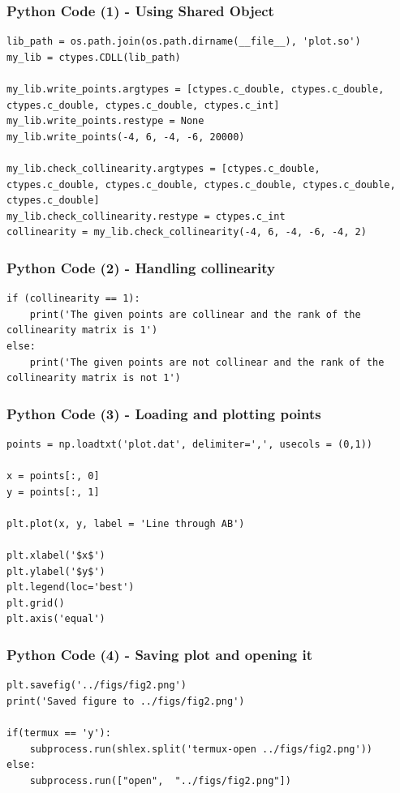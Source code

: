 \documentclass{beamer}
\begin{document}
\begin{frame}[fragile]
    \frametitle{Python Code (1) - Using Shared Object}
    \begin{lstlisting}
lib_path = os.path.join(os.path.dirname(__file__), 'plot.so')
my_lib = ctypes.CDLL(lib_path)

my_lib.write_points.argtypes = [ctypes.c_double, ctypes.c_double, ctypes.c_double, ctypes.c_double, ctypes.c_int]
my_lib.write_points.restype = None
my_lib.write_points(-4, 6, -4, -6, 20000)

my_lib.check_collinearity.argtypes = [ctypes.c_double, ctypes.c_double, ctypes.c_double, ctypes.c_double, ctypes.c_double, ctypes.c_double]
my_lib.check_collinearity.restype = ctypes.c_int
collinearity = my_lib.check_collinearity(-4, 6, -4, -6, -4, 2)
\end{lstlisting}
\end{frame}

\begin{frame}[fragile]
    \frametitle{Python Code (2) - Handling collinearity}
    \begin{lstlisting}
if (collinearity == 1):
    print('The given points are collinear and the rank of the collinearity matrix is 1')
else:
    print('The given points are not collinear and the rank of the collinearity matrix is not 1')
\end{lstlisting}
\end{frame}

\begin{frame}[fragile]
    \frametitle{Python Code (3) - Loading and plotting points}
    \begin{lstlisting}
points = np.loadtxt('plot.dat', delimiter=',', usecols = (0,1))

x = points[:, 0]
y = points[:, 1]

plt.plot(x, y, label = 'Line through AB')

plt.xlabel('$x$')
plt.ylabel('$y$')
plt.legend(loc='best')
plt.grid() 
plt.axis('equal')
\end{lstlisting}
\end{frame}

\begin{frame}[fragile]
    \frametitle{Python Code (4) - Saving plot and opening it}
    \begin{lstlisting}
plt.savefig('../figs/fig2.png')
print('Saved figure to ../figs/fig2.png')

if(termux == 'y'):
    subprocess.run(shlex.split('termux-open ../figs/fig2.png'))
else:
    subprocess.run(["open",  "../figs/fig2.png"])
\end{lstlisting}
\end{frame}
\end{document}
